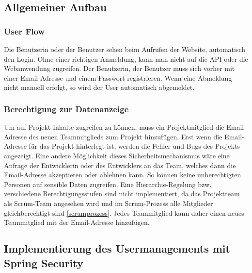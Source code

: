 \subsection{Allgemeiner Aufbau} 
\subsubsection{User Flow}
Die Benutzerin oder der Benutzer sehen beim Aufrufen der Website, automatisch den Login. Ohne einer richtigen Anmeldung, kann man nicht auf die API oder die Webanwendung zugreifen. Der Benutzerin, der Benutzer muss sich vorher mit einer Email-Adresse und einem Passwort registrieren. Wenn eine Abmeldung nicht manuell erfolgt, so wird der User automatisch abgemeldet.
\subsubsection{Berechtigung zur Datenanzeige}
Um auf Projekt-Inhalte zugreifen zu können, muss ein Projektmitglied die Email-Adresse des neuen Teammitglieds zum Projekt hinzufügen. Erst wenn die Email-Adresse für das Projekt hinterlegt ist, werden die Fehler und Bugs des Projekts angezeigt. Eine andere Möglichkeit dieses Sicherheitsmechanismus wäre eine Anfrage der Entwicklerin oder des Entwicklers an das Team, welches dann die Email-Adresse akzeptieren oder ablehnen kann. So können keine unberechtigten Personen auf sensible Daten zugreifen. Eine Hierarchie-Regelung bzw. verschiedene Berechtigungsstufen sind nicht implementiert, da das Projektteam als Scrum-Team angesehen wird und im Scrum-Prozess alle Mitglieder gleichberechtigt sind \ref{scrumprozess}. Jedes Teammitglied kann daher einen neues Teammitglied mit der Email-Adresse hinzufügen.

\subsection{Implementierung des Usermanagements mit Spring Security}
